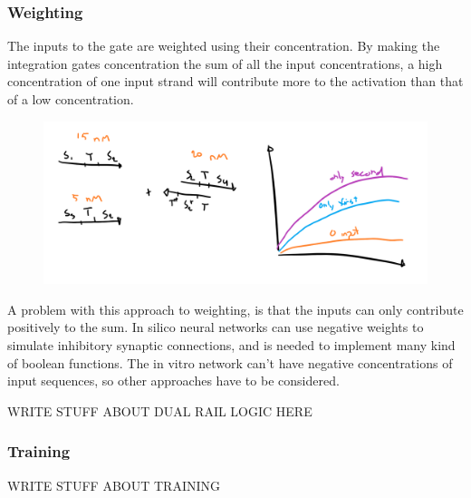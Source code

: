 \subsubsection{Weighting}
The inputs to the gate are weighted using their concentration. By making the integration gates concentration the sum of all the input concentrations, a high concentration of one input strand will contribute more to the activation than that of a low concentration.

\begin{figure}[H]
\centering
\includegraphics[width=\columnwidth]{images/seesaw_weight.png}
\caption{}
\label{seesaw_weight}
\end{figure}

A problem with this approach to weighting, is that the inputs can only contribute positively to the sum. In silico neural networks can use negative weights to simulate inhibitory synaptic connections, and is needed to implement many kind of boolean functions. The in vitro network can't have negative concentrations of input sequences, so other approaches have to be considered.

WRITE STUFF ABOUT DUAL RAIL LOGIC HERE

\subsubsection{Training}
WRITE STUFF ABOUT TRAINING
